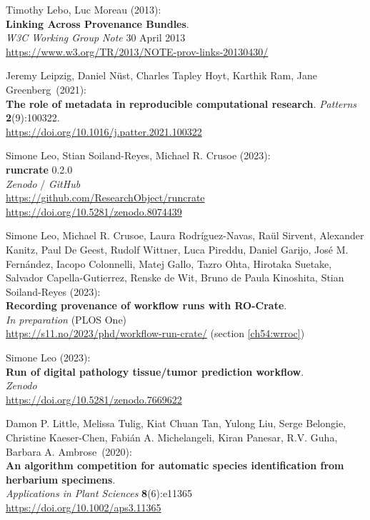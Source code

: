 \begin{thebibliography}{9}
Timothy Lebo, Luc Moreau (2013): \\
\textbf{Linking {Across Provenance Bundles}}.\\
\emph{W3C Working Group Note} 30 April 2013 \\
\url{https://www.w3.org/TR/2013/NOTE-prov-links-20130430/}

Jeremy Leipzig, Daniel Nüst, Charles Tapley Hoyt, Karthik Ram,
Jane Greenberg~(2021):\\
\textbf{The role of metadata in reproducible computational research}.
\emph{Patterns} \textbf{2}(9):100322.\\
\url{https://doi.org/10.1016/j.patter.2021.100322}

Simone Leo, Stian Soiland-Reyes, Michael R. Crusoe (2023):\\
\textbf{runcrate} 0.2.0\\
\emph{Zenodo} / \emph{GitHub}\\
\url{https://github.com/ResearchObject/runcrate}\\
\url{https://doi.org/10.5281/zenodo.8074439}

Simone Leo, Michael R. Crusoe, Laura Rodríguez-Navas, Raül Sirvent, Alexander Kanitz, Paul De Geest, Rudolf Wittner, Luca Pireddu, Daniel Garijo, José M. Fernández, Iacopo Colonnelli, Matej Gallo, Tazro Ohta, Hirotaka Suetake, Salvador Capella-Gutierrez, Renske de Wit, Bruno de Paula Kinoshita, Stian Soiland-Reyes (2023):\\
\textbf{Recording provenance of workflow runs with RO-Crate}.\\
\emph{In preparation} (PLOS One)\\
\url{https://s11.no/2023/phd/workflow-run-crate/} 
(section \vref{ch54:wrroc})

Simone Leo (2023):\\
\textbf{Run of digital pathology tissue/tumor prediction workflow}.\\
\emph{Zenodo}\\
\url{https://doi.org/10.5281/zenodo.7669622}

Damon P. Little, Melissa Tulig, Kiat Chuan Tan, Yulong Liu, Serge Belongie, Christine Kaeser‐Chen, Fabián A. Michelangeli, Kiran Panesar, R.V. Guha, Barbara A. Ambrose~(2020):\\
\textbf{An algorithm competition for automatic species identification from herbarium specimens}.\\
\emph{Applications in Plant Sciences} \textbf{8}(6):e11365\\
\url{https://doi.org/10.1002/aps3.11365}


\end{thebibliography}
